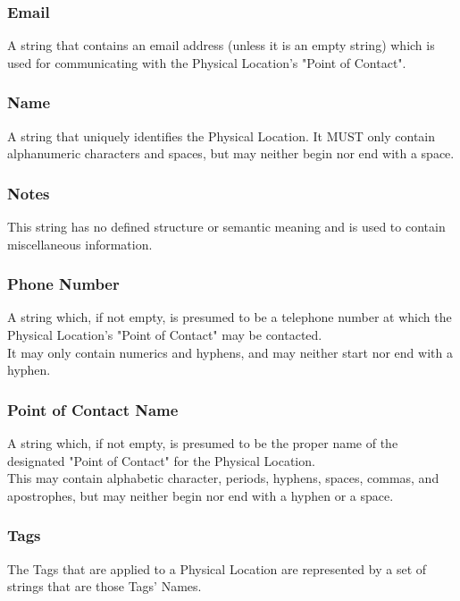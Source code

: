\subsubsection{Email}
A string that contains an email address (unless it is an empty string) which is
used for communicating with the Physical Location's "Point of Contact".

\subsubsection{Name}
A string that uniquely identifies the Physical Location. It MUST only contain
alphanumeric characters and spaces, but may neither begin nor end with a space.

\subsubsection{Notes}
This string has no defined structure or semantic meaning and is used to contain
miscellaneous information.

\subsubsection{Phone Number}
A string which, if not empty, is presumed to be a telephone number at which the
Physical Location's "Point of Contact" may be contacted.\\
It may only contain numerics and hyphens, and may neither start nor end with a
hyphen.

\subsubsection{Point of Contact Name}
A string which, if not empty, is presumed to be the proper name of the
designated "Point of Contact" for the Physical Location.\\
This may contain alphabetic character, periods, hyphens, spaces, commas, and
apostrophes, but may neither begin nor end with a hyphen or a space.

\subsubsection{Tags}
The Tags that are applied to a Physical Location are represented by a set of
strings that are those Tags' Names.

